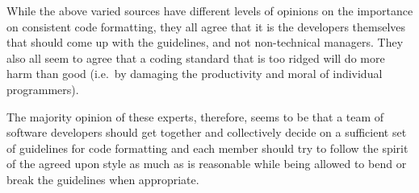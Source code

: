 While the above varied sources have different levels of opinions on the
importance on consistent code formatting, they all agree that it is the
developers themselves that should come up with the guidelines, and not
non-technical managers.  They also all seem to agree that a coding standard
that is too ridged will do more harm than good (i.e.\ by damaging the
productivity and moral of individual programmers).

The majority opinion of these experts, therefore, seems to be that a team of
software developers should get together and collectively decide on a
sufficient set of guidelines for code formatting and each member should try to
follow the spirit of the agreed upon style as much as is reasonable while
being allowed to bend or break the guidelines when appropriate.

